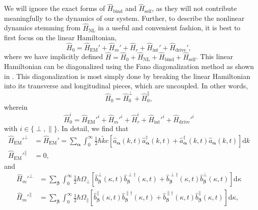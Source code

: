 \documentclass{article}
\begin{document}
We will ignore the exact forms of $\hat{H}_\mathrm{bind}$ and $\hat{H}_\mathrm{self}$, as they will not contribute meaningfully to the dynamics of our system. Further, to describe the nonlinear dynamics stemming from $\hat{H}_\mathrm{NL}$ in a useful and convenient fashion, it is best to first focus on the linear Hamiltonian,
\begin{equation}
\hat{H}_0 = \hat{H}_\mathrm{EM}' + \hat{H}_m' + \hat{H}_r + \hat{H}_\mathrm{int}' + \hat{H}_\mathrm{drive}',
\end{equation}
where we have implicitly defined $\hat{H} = \hat{H}_0 + \hat{H}_\mathrm{NL} + \hat{H}_\mathrm{bind} + \hat{H}_\mathrm{self}$. This linear Hamiltonian can be diagonalized using the Fano diagonalization method as shown in \citet{huttner1992quantization}. This diagonalization is most simply done by breaking the linear Hamiltonian into its transverse and longitudinal pieces, which are uncoupled. In other words,
\begin{equation}
\hat{H}_0 = \hat{H}_0^\perp + \hat{H}_0^\parallel,
\end{equation}
wherein
\begin{equation}
\hat{H}_0^i = \hat{H}_\mathrm{EM}'^i + \hat{H}_m'^i + \hat{H}_r^i + \hat{H}_\mathrm{int}'^i + \hat{H}_\mathrm{drive}'^i
\end{equation}
with $i\in\{\perp,\parallel\}$. In detail, we find that
\begin{equation}
\begin{split}
\hat{H}_\mathrm{EM}'^\perp &= \hat{H}_{\mathrm{EM}}' = \sum_{\bm{\alpha}}\int_0^\infty\frac{1}{2}\hbar\tilde{k}c\left[\hat{a}_{\bm{\alpha}}(k,t)\hat{a}_{\bm{\alpha}}^\dagger(k,t) + \hat{a}_{\bm{\alpha}}^\dagger(k,t)\hat{a}_{\bm{\alpha}}(k,t)\right]\mathrm{d}k\\
\hat{H}_\mathrm{EM}'^\parallel &= 0,
\end{split}
\end{equation}
and
\begin{equation}
\begin{split}
\hat{H}_m'^\perp &= \sum_{\bm{\beta}}\int_0^\infty\frac{1}{2}\hbar\Omega_\perp\left[\hat{b}_{\bm{\beta}}^\perp(\kappa,t)\hat{b}_{\bm{\beta}}^{\perp\dagger}(\kappa,t) + \hat{b}_{\bm{\beta}}^{\perp\dagger}(\kappa,t)\hat{b}_{\bm{\beta}}^\perp(\kappa,t)\right]\mathrm{d}\kappa\\
\hat{H}_m'^\parallel &= \sum_{\bm{\beta}}\int_0^\infty\frac{1}{2}\hbar\Omega_\parallel\left[\hat{b}_{\bm{\beta}}^\parallel(\kappa,t)\hat{b}_{\bm{\beta}}^{\parallel\dagger}(\kappa,t) + \hat{b}_{\bm{\beta}}^{\parallel\dagger}(\kappa,t)\hat{b}_{\bm{\beta}}^\parallel(\kappa,t)\right]\mathrm{d}\kappa,
\end{split}
\end{equation}
\end{document}
